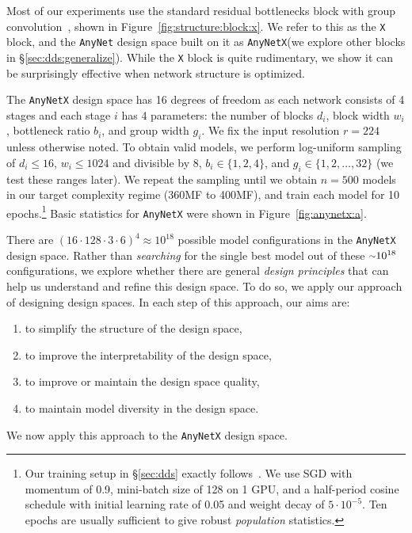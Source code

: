 \documentclass[10pt,twocolumn,letterpaper]{article}
\newcommand{\app}{\raise.17ex\hbox{$\scriptstyle\sim$}}
\def\c{{\cdot}}
\newcommand{\dsname}[1]{\texttt{\small #1}\xspace}
\newcommand{\anynet}{\dsname{AnyNet}}
\newcommand{\anynetx}{\dsname{AnyNetX}}
\begin{document}
Most of our experiments use the standard residual bottlenecks block with group convolution~\cite{Xie2017}, shown in Figure~\ref{fig:structure:block:x}. We refer to this as the \dsname{X} block, and the \anynet design space built on it as \anynetx (we explore other blocks in \S\ref{sec:dds:generalize}). While the \dsname{X} block is quite rudimentary, we show it can be surprisingly effective when network structure is optimized.

The \anynetx design space has 16 degrees of freedom as each network consists of 4 stages and each stage $i$ has 4 parameters: the number of blocks $d_i$, block width $w_i$, bottleneck ratio $b_i$, and group width $g_i$. We fix the input resolution $r=224$ unless otherwise noted. To obtain valid models, we perform log-uniform sampling of $d_i\le16$, $w_i\le1024$ and divisible by 8, $b_i\in\{1, 2, 4\}$, and $g_i\in\{1, 2, \ldots, 32\}$ (we test these ranges later). We repeat the sampling until we obtain $n=500$ models in our target complexity regime (360MF to 400MF), and train each model for 10 epochs.\footnote{Our training setup in \S\ref{sec:dds} exactly follows~\cite{Radosavovic2019}. We use SGD with momentum of 0.9, mini-batch size of 128 on 1 GPU, and a half-period cosine schedule with initial learning rate of 0.05 and weight decay of $5\c10^{-5}$. Ten epochs are usually sufficient to give robust \emph{population} statistics.} Basic statistics for \anynetx were shown in Figure~\ref{fig:anynetx:a}.

There are $(16\c128\c3\c6)^4 \approx 10^{18}$ possible model configurations in the \anynetx design space. Rather than \emph{searching} for the single best model out of these $\app10^{18}$ configurations, we explore whether there are general \emph{design principles} that can help us understand and refine this design space. To do so, we apply our approach of designing design spaces. In each step of this approach, our aims are:
\begin{enumerate}[topsep=2.5pt, itemsep=-0.8ex]
\item to simplify the structure of the design space,
\item to improve the interpretability of the design space,
\item to improve or maintain the design space quality,
\item to maintain model diversity in the design space.
\end{enumerate}
We now apply this approach to the \anynetx design space.
\end{document}
